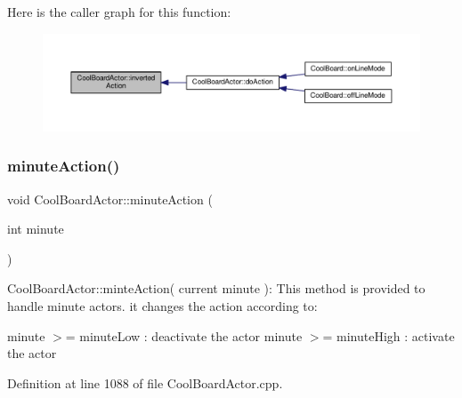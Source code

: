 Here is the caller graph for this function\+:
\nopagebreak
\begin{figure}[H]
\begin{center}
\leavevmode
\includegraphics[width=350pt]{dc/d69/class_cool_board_actor_aae82b2e62f91be009d40f93c206f9bda_icgraph}
\end{center}
\end{figure}
\mbox{\label{class_cool_board_actor_af000944ce0b9abb9c6ee4b8fe839fb36}} 
\subsubsection{\texorpdfstring{minute\+Action()}{minuteAction()}}
{\footnotesize\ttfamily void Cool\+Board\+Actor\+::minute\+Action (\begin{DoxyParamCaption}\item[{int}]{minute }\end{DoxyParamCaption})}

Cool\+Board\+Actor\+::minte\+Action( current minute )\+: This method is provided to handle minute actors. it changes the action according to\+:

minute $>$= minute\+Low \+: deactivate the actor minute $>$= minute\+High \+: activate the actor 

Definition at line 1088 of file Cool\+Board\+Actor.\+cpp.


